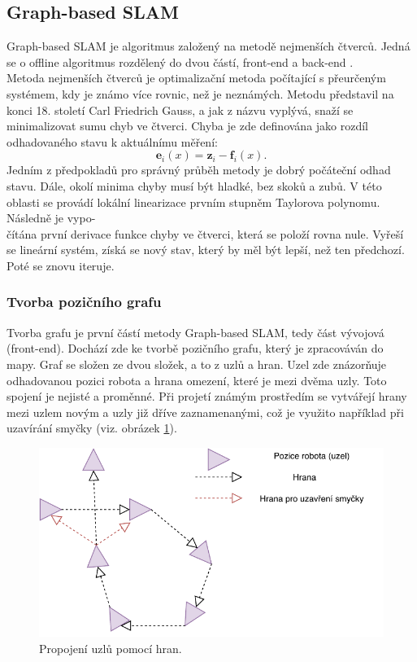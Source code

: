 \documentclass[12pt]{report}
\begin{document}
\newpage

\subsection{Graph-based SLAM}
Graph-based SLAM je algoritmus založený na metodě nejmenších čtverců. Jedná se o offline algoritmus rozdělený do dvou částí, front-end a back-end \cite{Grisetti2010}.\\
\indent Metoda nejmenších čtverců je optimalizační metoda počítající s přeurčeným systémem, kdy je známo více rovnic, než je neznámých. Metodu představil na konci 18. století Carl Friedrich Gauss, a jak z názvu vyplývá, snaží se minimalizovat sumu chyb ve čtverci. Chyba je zde definována jako rozdíl odhadovaného stavu k aktuálnímu měření:
\begin{equation}
	\textbf{e}_i(x)=\textbf{z}_i-\textbf{f}_i(x).
\end{equation}  
Jedním z předpokladů pro správný průběh metody je dobrý počáteční odhad stavu. Dále, okolí minima chyby musí být hladké, bez skoků a zubů. V této oblasti se provádí lokální linearizace prvním stupněm Taylorova polynomu. Následně je vypo-\\čítána první derivace funkce chyby ve čtverci, která se položí rovna nule. Vyřeší se lineární systém, získá se nový stav, který by měl být lepší, než ten předchozí. Poté se znovu iteruje.

\subsubsection{Tvorba pozičního grafu}
Tvorba grafu je první částí metody Graph-based SLAM, tedy část vývojová (front-end). Dochází zde ke tvorbě pozičního grafu, který je zpracováván do mapy. Graf se složen ze dvou složek, a to z uzlů a hran. Uzel zde znázorňuje odhadovanou pozici robota a hrana omezení, které je mezi dvěma uzly. Toto spojení je nejisté a proměnné. Při projetí známým prostředím se vytvářejí hrany mezi uzlem novým a uzly již dříve zaznamenanými, což je využito například při uzavírání smyčky (viz. obrázek \ref{fig:GBS_constrains}).\\
\begin{figure}[!ht]
	\begin{center}
		\includegraphics[width=0.6\columnwidth]{imgs/GBS_constrains.pdf}
	\end{center}
	\caption{Propojení uzlů pomocí hran.}
	\label{fig:GBS_constrains}
\end{figure}
\end{document}
